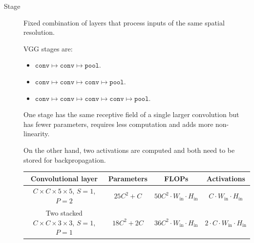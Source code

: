 \begin{description}
    \item[Stage] 
        Fixed combination of layers that process inputs of the same spatial resolution.

        VGG stages are:
        \begin{itemize}
            \item $\texttt{conv} \mapsto \texttt{conv} \mapsto \texttt{pool}$.
            \item $\texttt{conv} \mapsto \texttt{conv} \mapsto \texttt{conv} \mapsto \texttt{pool}$.
            \item $\texttt{conv} \mapsto \texttt{conv} \mapsto \texttt{conv} \mapsto \texttt{conv} \mapsto \texttt{pool}$.
        \end{itemize}

        \begin{remark}
            One stage has the same receptive field of a single larger convolution but 
            has fewer parameters, requires less computation and adds more non-linearity.

            On the other hand, two activations are computed and both need to be stored for backpropagation.

            \begin{example}
                \phantom{}
                \begin{center}
                    \footnotesize
                    \begin{tabular}{cccc}
                        \toprule
                        \textbf{Convolutional layer} & \textbf{Parameters} & \textbf{FLOPs} & \textbf{Activations} \\
                        \midrule
                        $C \times C \times 5 \times 5$, $S=1$, $P=2$ & $25C^2 + C$ & $50C^2 \cdot W_\text{in} \cdot H_\text{in}$ & $C \cdot W_\text{in} \cdot H_\text{in}$ \\
                        Two stacked $C \times C \times 3 \times 3$, $S=1$, $P=1$ & $18C^2 + 2C$ & $36C^2 \cdot W_\text{in} \cdot H_\text{in}$ & $2 \cdot C \cdot W_\text{in} \cdot H_\text{in}$ \\
                        \bottomrule
                    \end{tabular}
                \end{center}
            \end{example}
        \end{remark}
\end{description}

